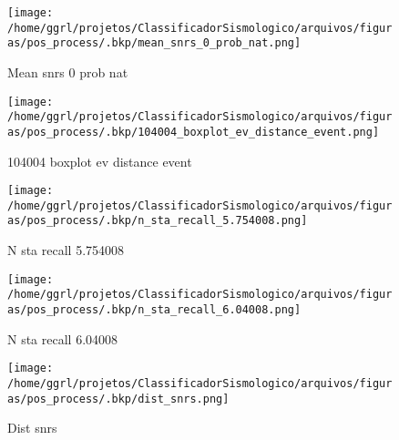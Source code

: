                     \begin{figure}[H]
                        \centering
                        \texttt{[image: /home/ggrl/projetos/ClassificadorSismologico/arquivos/figuras/pos\_process/.bkp/mean\_snrs\_0\_prob\_nat.png]}
                        \caption{Mean snrs 0 prob nat}
                        \label{fig:mean_snrs_0_prob_nat}
                    \end{figure}
                

                    \begin{figure}[H]
                        \centering
                        \texttt{[image: /home/ggrl/projetos/ClassificadorSismologico/arquivos/figuras/pos\_process/.bkp/104004\_boxplot\_ev\_distance\_event.png]}
                        \caption{104004 boxplot ev distance event}
                        \label{fig:104004_boxplot_ev_distance_event}
                    \end{figure}
                

                    \begin{figure}[H]
                        \centering
                        \texttt{[image: /home/ggrl/projetos/ClassificadorSismologico/arquivos/figuras/pos\_process/.bkp/n\_sta\_recall\_5.754008.png]}
                        \caption{N sta recall 5.754008}
                        \label{fig:n_sta_recall_5.754008}
                    \end{figure}
                

                    \begin{figure}[H]
                        \centering
                        \texttt{[image: /home/ggrl/projetos/ClassificadorSismologico/arquivos/figuras/pos\_process/.bkp/n\_sta\_recall\_6.04008.png]}
                        \caption{N sta recall 6.04008}
                        \label{fig:n_sta_recall_6.04008}
                    \end{figure}
                

                    \begin{figure}[H]
                        \centering
                        \texttt{[image: /home/ggrl/projetos/ClassificadorSismologico/arquivos/figuras/pos\_process/.bkp/dist\_snrs.png]}
                        \caption{Dist snrs}
                        \label{fig:dist_snrs}
                    \end{figure}
                

